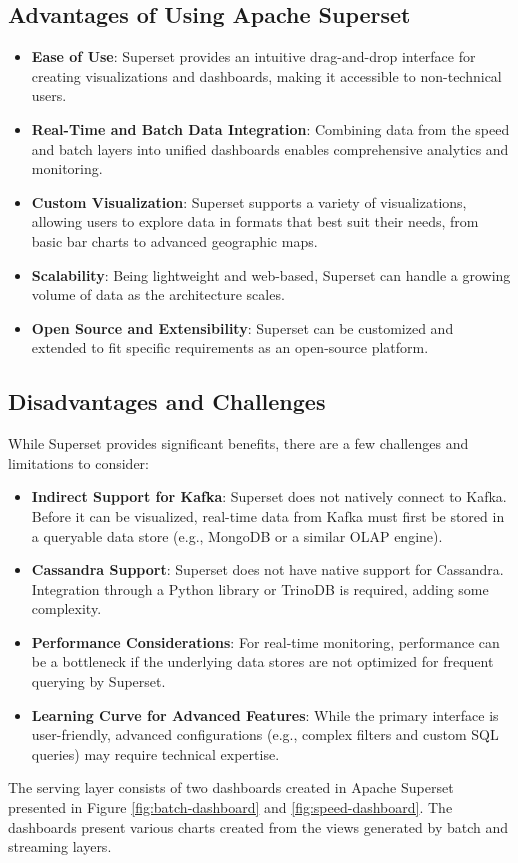 \documentclass[12pt,a4paper, hidelinks]{article}
\begin{document}
\subsection{Advantages of Using Apache Superset}
\begin{itemize}
    \item \textbf{Ease of Use}: Superset provides an intuitive drag-and-drop interface for creating visualizations and dashboards, making it accessible to non-technical users.
    \item \textbf{Real-Time and Batch Data Integration}: Combining data from the speed and batch layers into unified dashboards enables comprehensive analytics and monitoring.
    \item \textbf{Custom Visualization}: Superset supports a variety of visualizations, allowing users to explore data in formats that best suit their needs, from basic bar charts to advanced geographic maps.
    \item \textbf{Scalability}: Being lightweight and web-based, Superset can handle a growing volume of data as the architecture scales.
    \item \textbf{Open Source and Extensibility}: Superset can be customized and extended to fit specific requirements as an open-source platform.
\end{itemize}

\subsection{Disadvantages and Challenges}
While Superset provides significant benefits, there are a few challenges and limitations to consider:
\begin{itemize}
    \item \textbf{Indirect Support for Kafka}: Superset does not natively connect to Kafka. Before it can be visualized, real-time data from Kafka must first be stored in a queryable data store (e.g., MongoDB or a similar OLAP engine).
    \item \textbf{Cassandra Support}: Superset does not have native support for Cassandra. Integration through a Python library or TrinoDB is required, adding some complexity.
    \item \textbf{Performance Considerations}: For real-time monitoring, performance can be a bottleneck if the underlying data stores are not optimized for frequent querying by Superset.
    \item \textbf{Learning Curve for Advanced Features}: While the primary interface is user-friendly, advanced configurations (e.g., complex filters and custom SQL queries) may require technical expertise.
\end{itemize}
The serving layer consists of two dashboards created in Apache Superset presented in Figure \ref{fig:batch-dashboard} and \ref{fig:speed-dashboard}. The dashboards present various charts created from the views generated by batch and streaming layers.
\end{document}
